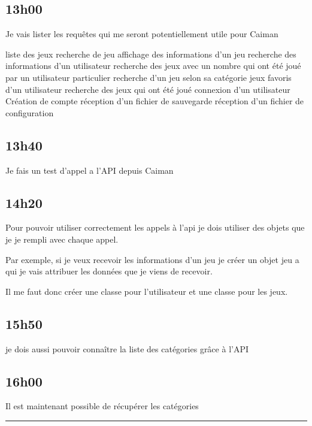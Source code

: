 \documentclass[a4paper,12pt,french]{sphinxmanual}
\begin{document}
\subsection{13h00}
\label{\detokenize{logbook:id99}}
\sphinxAtStartPar
Je vais lister les requêtes qui me seront potentiellement utile pour Caiman

\sphinxAtStartPar
liste des jeux
recherche de jeu
affichage des informations d’un jeu
recherche des informations d’un utilisateur
recherche des jeux avec un nombre qui ont été joué par un utilisateur particulier
recherche d’un jeu selon sa catégorie
jeux favoris d’un utilisateur
recherche des jeux qui ont été joué
connexion d’un utilisateur
Création de compte
réception d’un fichier de sauvegarde
réception d’un fichier de configuration


\subsection{13h40}
\label{\detokenize{logbook:id100}}
\sphinxAtStartPar
Je fais un test d’appel a l’API depuis Caiman


\subsection{14h20}
\label{\detokenize{logbook:id101}}
\sphinxAtStartPar
Pour pouvoir utiliser correctement les appels à l’api je dois utiliser des objets que je je rempli avec chaque appel.

\sphinxAtStartPar
Par exemple, si je veux recevoir les informations d’un jeu je créer un objet jeu a qui je vais attribuer les données que je viens de recevoir.

\sphinxAtStartPar
Il me faut donc créer une classe pour l’utilisateur et une classe pour les jeux.


\subsection{15h50}
\label{\detokenize{logbook:id102}}
\sphinxAtStartPar
je dois aussi pouvoir connaître la liste des catégories grâce à l’API


\subsection{16h00}
\label{\detokenize{logbook:id103}}
\sphinxAtStartPar
Il est maintenant possible de récupérer les catégories


\bigskip\hrule\bigskip
\end{document}
